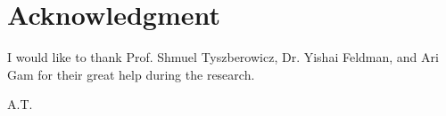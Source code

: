 \section*{Acknowledgment}
I would like to thank Prof. Shmuel Tyszberowicz, Dr. Yishai Feldman, and Ari Gam for their great help during the research. 

\begin{flushright}
A.T.\\[1pc]
\end{flushright}